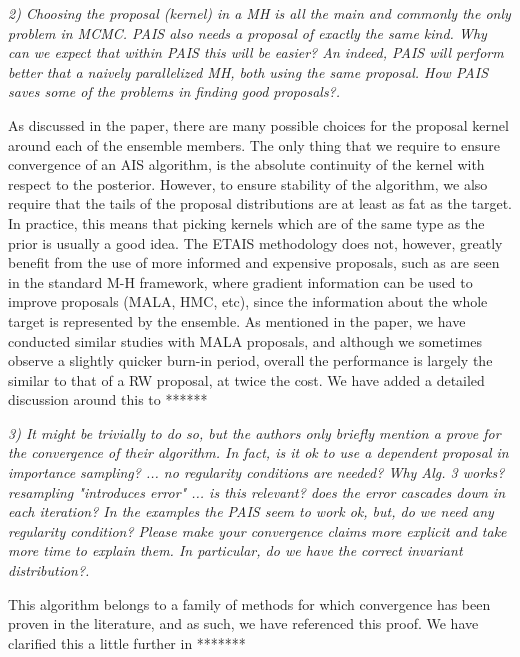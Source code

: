 \documentclass{article}
\newcommand{\comment}[2]{\vspace{0.6cm}{\bf Comment:} {\it #1.}

\vspace{0.3cm}{\bf Answer:} #2}
\begin{document}
\comment{2) Choosing the proposal (kernel) in a MH is all the main and commonly the only problem in MCMC. PAIS also needs a proposal of exactly the same kind. Why can we expect that within PAIS this will be easier? An indeed, PAIS will perform better that a naively parallelized MH, both using the same proposal. How PAIS saves some of the problems in finding good proposals?}{As discussed in the paper, there are many possible choices for the proposal kernel around each of the ensemble members. The only thing that we require to ensure convergence of an AIS algorithm, is the absolute continuity of the kernel with respect to the posterior. However, to ensure stability of the algorithm, we also require that the tails of the proposal distributions are at least as fat as the target. In practice, this means that picking kernels which are of the same type as the prior is usually a good idea. The ETAIS methodology does not, however, greatly benefit from the use of more informed and expensive proposals, such as are seen in the standard M-H framework, where gradient information can be used to improve proposals (MALA, HMC, etc), since the information about the whole target is represented by the ensemble. As mentioned in the paper, we have conducted similar studies with MALA proposals, and although we sometimes observe a slightly quicker burn-in period, overall the performance is largely the similar to that of a RW proposal, at twice the cost. We have added a detailed discussion around this to ******}

\comment{3) It might be trivially to do so, but the authors only briefly mention a prove for the convergence of their algorithm. In fact, is it ok to use a dependent proposal in importance sampling? ... no regularity conditions are needed? Why Alg. 3 works? resampling "introduces error" ... is this relevant? does the error cascades down in each iteration? In the examples the PAIS seem to work ok, but, do we need any regularity condition? Please make your convergence claims more explicit and take more time to explain them. In particular, do we have the correct invariant distribution?}{This algorithm belongs to a family of methods for which convergence has been proven in the literature, and as such, we have referenced this proof. We have clarified this a little further in *******}
\end{document}
